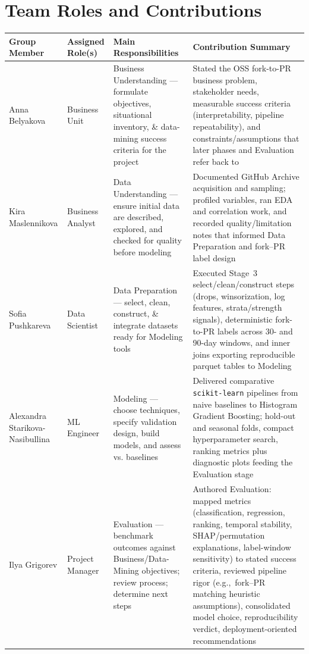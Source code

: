 \section{Team Roles and Contributions}

\begin{table}[H]
  \centering
  \renewcommand{\arraystretch}{1.25}
  \small
  \begin{tabular}{%
    >{\raggedright\arraybackslash}p{2.6cm}%
    >{\raggedright\arraybackslash}p{3.2cm}%
    >{\raggedright\arraybackslash}p{4.5cm}%
    >{\raggedright\arraybackslash}p{5.9cm}%
  }
    \hline
    \textbf{Group Member} & \textbf{Assigned Role(s)} & \textbf{Main Responsibilities} & \textbf{Contribution Summary} \\
    \hline
    Anna Belyakova & Business Unit & Business Understanding --- formulate objectives, situational inventory, \& data-mining success criteria for the project & Stated the OSS fork-to-PR business problem, stakeholder needs, measurable success criteria (interpretability, pipeline repeatability), and constraints/assumptions that later phases and Evaluation refer back to \\
    Kira Maslennikova & Business Analyst & Data Understanding --- ensure initial data are described, explored, and checked for quality before modeling & Documented GitHub Archive acquisition and sampling; profiled variables, ran EDA and correlation work, and recorded quality/limitation notes that informed Data Preparation and fork--PR label design \\
    Sofia Pushkareva & Data Scientist & Data Preparation --- select, clean, construct, \& integrate datasets ready for Modeling tools & Executed Stage~3 select/clean/construct steps (drops, winsorization, log features, strata/strength signals), deterministic fork-to-PR labels across 30- and 90-day windows, and inner joins exporting reproducible parquet tables to Modeling \\
    Alexandra Starikova-Nasibullina & ML Engineer & Modeling --- choose techniques, specify validation design, build models, and assess vs. baselines & Delivered comparative \texttt{scikit-learn} pipelines from naive baselines to Histogram Gradient Boosting; hold-out and seasonal folds, compact hyperparameter search, ranking metrics plus diagnostic plots feeding the Evaluation stage \\
    Ilya Grigorev & Project Manager & Evaluation --- benchmark outcomes against Business/Data-Mining objectives; review process; determine next steps & Authored Evaluation: mapped metrics (classification, regression, ranking, temporal stability, SHAP/permutation explanations, label-window sensitivity) to stated success criteria, reviewed pipeline rigor (e.g.,\ fork--PR matching heuristic assumptions), consolidated model choice, reproducibility verdict, deployment-oriented recommendations \\
    \hline
  \end{tabular}
\end{table}
